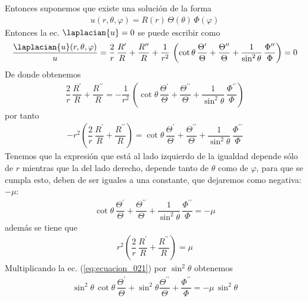 Entonces suponemos que existe una solución de la forma
\begin{align*}
u (r, \theta, \varphi) = R(r)\, \Theta (\theta) \, \Phi (\varphi)
\end{align*}
Entonces la ec. $\laplacian{u} = 0$ se puede escribir como
\begin{align*}
\dfrac{\laplacian{u} (r, \theta, \varphi)}{u} = \dfrac{2}{r} \, \dfrac{R^{\prime}}{R} + \dfrac{R^{\prime \prime}}{R} + \dfrac{1}{r^{2}} \, \left( \cot \theta \, \dfrac{\Theta^{\prime}}{\Theta} + \dfrac{\Theta^{\prime \prime}}{\Theta} + \dfrac{1}{\sin^{2} \theta} \, \dfrac{\Phi^{\prime \prime}}{\Phi} \right) = 0  
\end{align*}
De donde obtenemos
\begin{align*}
\dfrac{2}{r} \, \dfrac{R^{\prime}}{R} + \dfrac{R^{\prime \prime}}{R} = - \dfrac{1}{r^{2}} \, \left( \cot \theta \, \dfrac{\Theta^{\prime}}{\Theta} + \dfrac{\Theta^{\prime \prime}}{\Theta} + \dfrac{1}{\sin^{2} \theta} \, \dfrac{\Phi^{\prime \prime}}{\Phi} \right)
\end{align*}
por tanto
\begin{align}
- r^{2} \left( \dfrac{2}{r} \, \dfrac{R^{\prime}}{R} + \dfrac{R^{\prime \prime}}{R} \right) = \cot \theta \, \dfrac{\Theta^{\prime}}{\Theta} + \dfrac{\Theta^{\prime \prime}}{\Theta} + \dfrac{1}{\sin^{2} \theta} \, \dfrac{\Phi^{\prime \prime}}{\Phi}
\label{eq:ecuacion_021}
\end{align}
Tenemos que la expresión que está al lado izquierdo de la igualdad depende sólo de $r$ mientras que la del lado derecho, depende tanto de $\theta$ como de $\varphi$, para que se cumpla esto, deben de ser iguales a una constante, que dejaremos como negativa: $- \mu$:
\begin{align}
\cot \theta \, \dfrac{\Theta^{\prime}}{\Theta} + \dfrac{\Theta^{\prime \prime}}{\Theta} + \dfrac{1}{\sin^{2} \theta} \, \dfrac{\Phi^{\prime \prime}}{\Phi} = - \mu
\label{eq:ecuacion_022}
\end{align}
además se tiene que
\begin{align}
r^{2} \left( \dfrac{2}{r} \, \dfrac{R^{\prime}}{R} + \dfrac{R^{\prime \prime}}{R} \right) = \mu
\label{eq:ecuacion_023}    
\end{align}
Multiplicando la ec. (\ref{eq:ecuacion_021}) por $\sin^{2} \theta$ obtenemos
\begin{align*}
\sin^{2} \theta \, \cot \theta \, \dfrac{\Theta^{\prime}}{\Theta} + \sin^{2} \theta \dfrac{\Theta^{\prime \prime}}{\Theta} + \dfrac{\Phi^{\prime \prime}}{\Phi} = - \mu \, \sin^{2} \theta
\end{align*}
